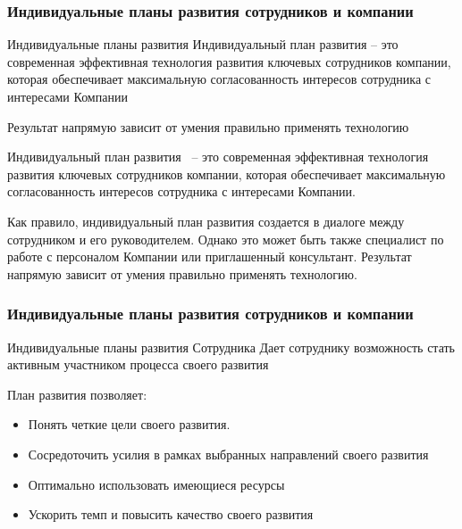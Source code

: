 \documentclass{../industrial-development}
\begin{document}
{%

\begin{frame} \frametitle{Индивидуальные планы развития сотрудников и компании}
  \begin{block}{Индивидуальные планы развития}
 \alert{Индивидуальный план развития} – это современная эффективная технология развития ключевых сотрудников компании, которая обеспечивает максимальную согласованность интересов сотрудника с интересами Компании
  \end{block}
  
  \begin{block}{}
Результат напрямую зависит от умения правильно применять технологию
  \end{block}
\end{frame}

\lecturenotes
Индивидуальный план развития~\cite{IPl} – это современная эффективная технология развития ключевых сотрудников компании, которая обеспечивает максимальную согласованность интересов сотрудника с интересами Компании.

Как правило, индивидуальный план развития создается в диалоге между сотрудником и его руководителем. Однако это может быть также специалист по работе с персоналом Компании или приглашенный консультант. Результат напрямую зависит от умения правильно применять технологию.


\begin{frame} \frametitle{Индивидуальные планы развития сотрудников и компании}
  \begin{block}{Индивидуальные планы развития Сотрудника}
Дает сотруднику возможность стать активным участником процесса своего развития

План развития позволяет:
  \end{block}
  
   \begin{itemize}
  \item Понять четкие цели своего развития.
  \item Сосредоточить усилия в рамках выбранных направлений своего развития
  \item Оптимально использовать имеющиеся ресурсы
 \item Ускорить темп и повысить качество своего развития
  \end{itemize}
\end{frame}

}
\end{document}
